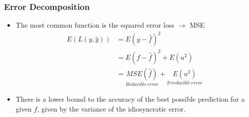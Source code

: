\documentclass[
  shownotes,
  xcolor={svgnames},
  hyperref={colorlinks,citecolor=DarkBlue,linkcolor=DarkRed,urlcolor=DarkBlue}
  , aspectratio=169]{beamer}
\begin{document}
\begin{frame}
\frametitle{Error Decomposition}

\begin{itemize} 
\item The most common function is the squared error loss $\rightarrow$ MSE
  \medskip
\begin{align}
E \left(L(y,\hat{y}) \right)  &= E(y-\hat f)^2  \\
                 &= E(f-\hat{f})^2 + E(u^2) \\
                 &=\underset{Reducible\,error}{ MSE(\hat f)} +  \underset{Irreducible\,error}{E(u^2)} 
\end{align}

\medskip

  \item There is a lower bound to the accuracy of the best possible prediction for a given $f$, given by the variance of the idiosyncratic error.
  
\end{itemize}

\end{frame}
\end{document}
